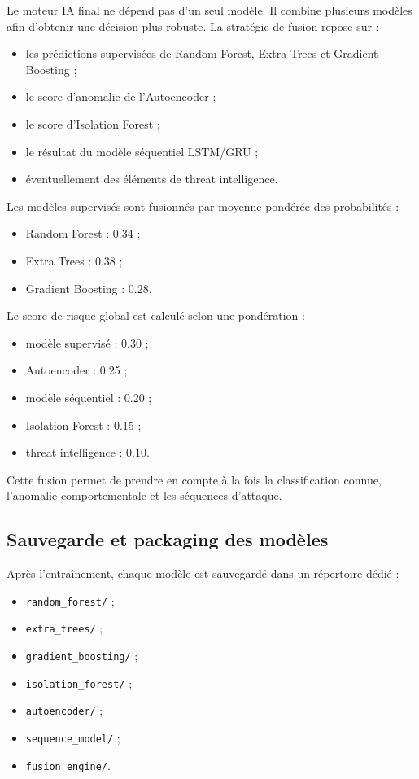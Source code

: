 \documentclass[12pt,a4paper,oneside]{report}
\begin{document}
	Le moteur IA final ne dépend pas d'un seul modèle. Il combine plusieurs modèles afin d'obtenir une décision plus robuste. La stratégie de fusion repose sur :
	
	\begin{itemize}
		\item les prédictions supervisées de Random Forest, Extra Trees et Gradient Boosting ;
		\item le score d'anomalie de l'Autoencoder ;
		\item le score d'Isolation Forest ;
		\item le résultat du modèle séquentiel LSTM/GRU ;
		\item éventuellement des éléments de threat intelligence.
	\end{itemize}
	
	Les modèles supervisés sont fusionnés par moyenne pondérée des probabilités :
	
	\begin{itemize}
		\item Random Forest : 0.34 ;
		\item Extra Trees : 0.38 ;
		\item Gradient Boosting : 0.28.
	\end{itemize}
	
	Le score de risque global est calculé selon une pondération :
	
	\begin{itemize}
		\item modèle supervisé : 0.30 ;
		\item Autoencoder : 0.25 ;
		\item modèle séquentiel : 0.20 ;
		\item Isolation Forest : 0.15 ;
		\item threat intelligence : 0.10.
	\end{itemize}
	
	Cette fusion permet de prendre en compte à la fois la classification connue, l'anomalie comportementale et les séquences d'attaque.
	
	\subsection{Sauvegarde et packaging des modèles}
	
	Après l'entraînement, chaque modèle est sauvegardé dans un répertoire dédié :
	
	\begin{itemize}
		\item \texttt{random\_forest/} ;
		\item \texttt{extra\_trees/} ;
		\item \texttt{gradient\_boosting/} ;
		\item \texttt{isolation\_forest/} ;
		\item \texttt{autoencoder/} ;
		\item \texttt{sequence\_model/} ;
		\item \texttt{fusion\_engine/}.
	\end{itemize}
	
\end{document}

